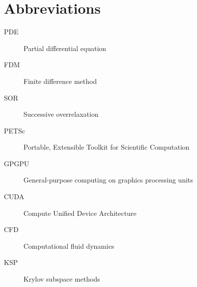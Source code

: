 \chapter{Abbreviations}

\begin{description}
	\item[PDE] Partial differential equation
	\item[FDM] Finite difference method
	\item[SOR] Successive overrelaxation
	\item[PETSc] Portable, Extensible Toolkit for Scientific Computation
	\item[GPGPU] General-purpose computing on graphics processing units
	\item[CUDA] Compute Unified Device Architecture
	\item[CFD] Computational fluid dynamics
	\item[KSP] Krylov subspace methods
\end{description}
